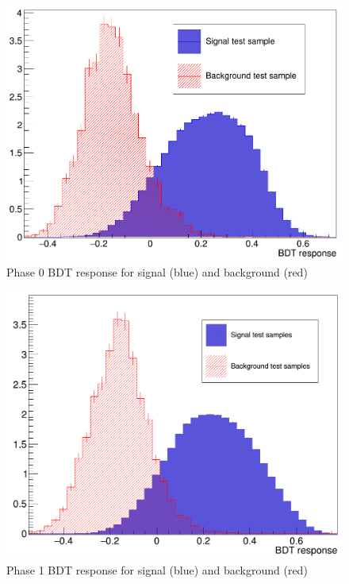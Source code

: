 \begin{figure}[h]
	\centering
	\includegraphics[width=0.9\linewidth]{Figures/Phase0BDTresponse}
	\caption[Phase 0 BDT response for signal and background]{Phase 0 BDT response for signal (blue) and background (red)}
	\label{fig:phase0bdtresponse}
\end{figure}
\begin{figure}[h]
	\centering
	\includegraphics[width=0.9\linewidth]{Figures/Phase1BDTresponse}
	\caption[Phase 1 BDT response for signal and background]{Phase 1 BDT response for signal (blue) and background (red)}
	\label{fig:phase1bdtresponse}
\end{figure}


